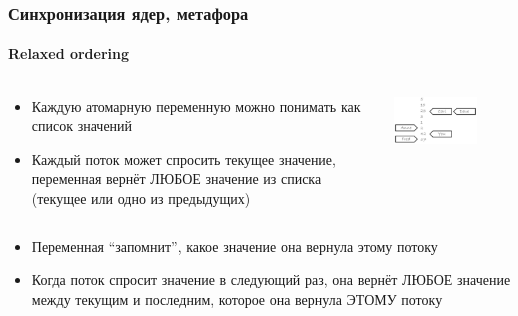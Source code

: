 \documentclass{../../slides-style}
\begin{document}
    \begin{frame}
        \frametitle{Синхронизация ядер, метафора}
        \framesubtitle{Relaxed ordering}
        \begin{columns}
            \begin{column}{0.6\textwidth}
                \begin{itemize}
                    \item Каждую атомарную переменную можно понимать как список значений
                    \item Каждый поток может спросить текущее значение, переменная вернёт ЛЮБОЕ значение из списка (текущее или одно из предыдущих)
                \end{itemize}
            \end{column}
            \begin{column}{0.4\textwidth}
                \begin{center}
                    \includegraphics[width=0.7\textwidth]{relaxedOrdering.png}
                \end{center}
            \end{column}
        \end{columns}
        \begin{itemize}
            \item Переменная ``запомнит'', какое значение она вернула этому потоку
            \item Когда поток спросит значение в следующий раз, она вернёт ЛЮБОЕ значение между текущим и последним, которое она вернула ЭТОМУ потоку
        \end{itemize}
    \end{frame}
\end{document}
